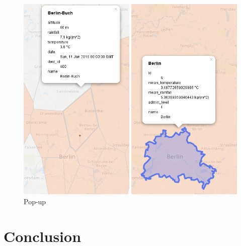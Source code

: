 \documentclass[paper=a4, fontsize=11pt]{article} %
\numberwithin{equation}{section} %
\numberwithin{figure}{section} %
\numberwithin{table}{section} %
\begin{document}
\begin{figure}[htbp]
\centering
\includegraphics[width=1\textwidth]{pictures/screenshot-popup.png}
\caption{Pop-up}
\label{fig:popup}
\end{figure}


\newpage
\section{Conclusion}
\end{document}
